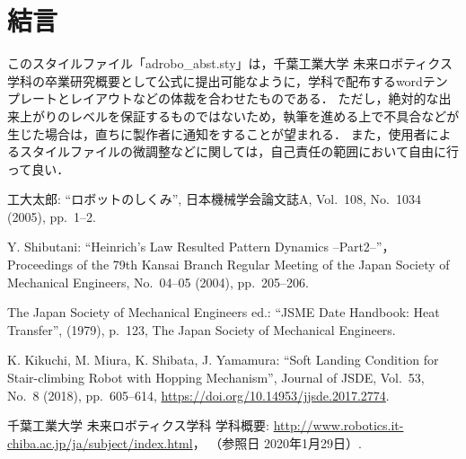 \documentclass[10pt]{jarticle}
\begin{document}
    \section{結\hspace{2zw}言}%
    このスタイルファイル「adrobo\_abst.sty」は，千葉工業大学 未来ロボティクス学科の卒業研究概要として公式に提出可能なように，学科で配布するwordテンプレートとレイアウトなどの体裁を合わせたものである．
    ただし，絶対的な出来上がりのレベルを保証するものではないため，執筆を進める上で不具合などが生じた場合は，直ちに製作者に通知をすることが望まれる．
    また，使用者によるスタイルファイルの微調整などに関しては，自己責任の範囲において自由に行って良い．
    
    \vspace{5truemm}
    {\footnotesize
        \begin{thebibliography}{99}
            
            工大太郎: ``ロボットのしくみ'', 
            日本機械学会論文誌A, 
            Vol.~108, No.~1034 (2005), pp.~1--2.
            
            Y. Shibutani: ``Heinrich's Law Resulted Pattern Dynamics --Part2--''，
            Proceedings of the 79th Kansai Branch Regular Meeting of the Japan Society of Mechanical Engineers,  
            No.~04--05 (2004), pp.~205--206.
            
            The Japan Society of Mechanical Engineers ed.: ``JSME Date Handbook: Heat Transfer'', 
            (1979), p.~123, The Japan Society of Mechanical Engineers.
            
            K. Kikuchi, M. Miura, K. Shibata, J. Yamamura: ``Soft Landing Condition for Stair-climbing Robot with Hopping Mechanism'', 
            Journal of JSDE, Vol.~53, No.~8 (2018), pp.~605--614, \url{https://doi.org/10.14953/jjsde.2017.2774}.
            
            千葉工業大学 未来ロボティクス学科 学科概要: 
            \url{http://www.robotics.it-chiba.ac.jp/ja/subject/index.html}， 
            （参照日 2020年1月29日）. 
            
        \end{thebibliography}
    }
    \normalsize
    
\end{document}
